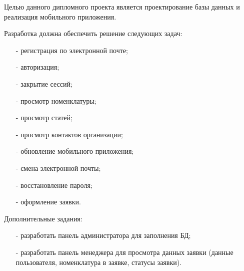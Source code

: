 Целью данного дипломного проекта является проектирование базы данных и реализация мобильного приложения.

Разработка должна обеспечить решение следующих задач:

\begin{itemize}
  \item[-] регистрация по электронной почте;
  \item[-] авторизация;
  \item[-] закрытие сессий;
  \item[-] просмотр номенклатуры;
  \item[-] просмотр статей;
  \item[-] просмотр контактов организации;
  \item[-] обновление мобильного приложения;
  \item[-] смена электронной почты;
  \item[-] восстановление пароля;
  \item[-] оформление заявки.
\end{itemize}

Дополнительные задания:

\begin{itemize}
  \item[-] разработать панель администратора для заполнения БД;
  \item[-] разработать панель менеджера для просмотра данных заявки (данные пользователя, номенклатура в заявке, статусы заявки).
\end{itemize}
